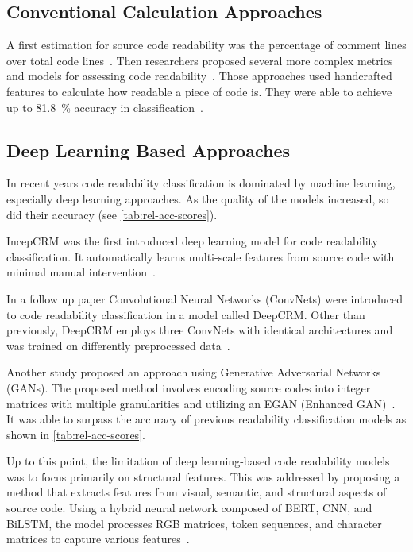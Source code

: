 \documentclass[%
class=scrreprt,
chapterprefix=false,%
open=right,%
twoside=false,%
paper=a4,%
logofile={Logo\_zentral\_farbig\_EN.png},%
thesistype=master,%
UKenglish,%
]{se2thesis}
\theoremstyle{definition}
\begin{document}
	
\subsection{Conventional Calculation Approaches} \label{Classical Calculation Approaches}
	A first estimation for source code readability was the percentage of comment lines over total code lines~\cite{aggarwal2002integrated}. Then researchers proposed several more complex metrics and models for assessing code readability~\cite{buse2009learning, posnett2011simpler, dorn2012general, scalabrino2018comprehensive}.
	Those approaches used handcrafted features to calculate how readable a piece of code is. They were able to achieve up to 81.8~\% accuracy in classification~\cite{scalabrino2018comprehensive}.
	
\subsection{Deep Learning Based Approaches} \label{Deep Learning Based Approaches}
	In recent years code readability classification is dominated by machine learning, especially deep learning approaches. As the quality of the models increased, so did their accuracy (see \autoref{tab:rel-acc-scores}).
	
	IncepCRM was the first introduced deep learning model for code readability classification. It automatically learns multi-scale features from source code with minimal manual intervention~\cite{mi2018inception}.
	
	In a follow up paper Convolutional Neural Networks (ConvNets) were introduced to code readability classification in a model called DeepCRM. Other than previously, DeepCRM employs three ConvNets with identical architectures and was trained on differently preprocessed data~\cite{mi2018improving}.
		
	Another study proposed an approach using Generative Adversarial Networks (GANs). The proposed method involves encoding source codes into integer matrices with multiple granularities and utilizing an EGAN (Enhanced GAN)~\cite{sharma2020egan}. It was able to surpass the accuracy of previous readability classification models as shown in \autoref{tab:rel-acc-scores}.
	
	Up to this point, the limitation of deep learning-based code readability models was to focus primarily on structural features. This was addressed by proposing a method that extracts features from visual, semantic, and structural aspects of source code. Using a hybrid neural network composed of BERT, CNN, and BiLSTM, the model processes RGB matrices, token sequences, and character matrices to capture various features~\cite{mi2022towards}.
	
\end{document}
